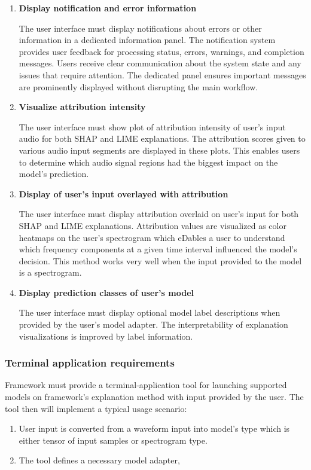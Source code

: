 \documentclass[
    bindingoffset=5mm,  %
    footnoteindent=3mm, %
    hyphenation=true    %
]{src/wut-thesis}
\begin{document}
\begin{enumerate}[itemsep=1\baselineskip]
    \item \textbf{Display notification and error information}

        The user interface must display notifications about errors or other information in a dedicated information
    panel. The notification system provides user feedback for processing status, errors, warnings,
    and completion messages. Users receive clear communication about the system state and any issues that
    require attention. The dedicated panel ensures important messages are prominently displayed without
    disrupting the main workflow.

    \item \textbf{Visualize attribution intensity}

        The user interface must show plot of attribution intensity of user's input audio
    for both SHAP and LIME explanations. The attribution scores given to various audio input segments are displayed in these plots. This enables users to determine which audio signal regions had the biggest impact on the model's prediction.

    \item \textbf{Display of user's input overlayed with attribution}

        The user interface must display attribution overlaid on user's input for both SHAP and LIME explanations.
    Attribution values are visualized as color heatmaps on the user's spectrogram which eDables a user to
    understand which frequency components at a given time interval influenced the model's decision.
    This method works very well when the input provided to the model is a spectrogram.

    \item \textbf{Display prediction classes of user's model}

        The user interface must display optional model label descriptions when provided by the user's model adapter.
    The interpretability of explanation visualizations is improved by label information.

    \end{enumerate}

\subsubsection{Terminal application requirements}
    Framework must provide a terminal-application tool for launching supported models on framework's explanation method with input provided by the user. The tool then will implement a typical usage scenario:
    \begin{enumerate}
        \item User input is converted from a waveform input into model's type which is either tensor of input samples or spectrogram type.
        \item The tool defines a necessary model adapter,
    \end{enumerate}
\end{document}

